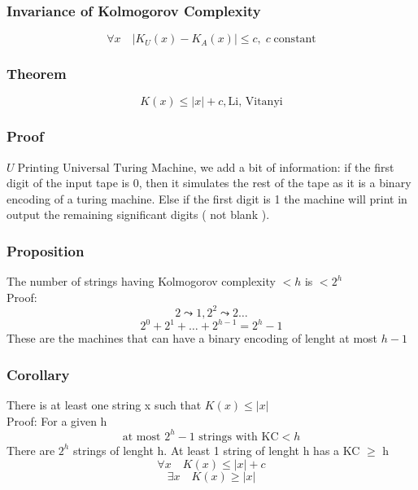     \subsubsection*{Invariance of Kolmogorov Complexity}
    $$\forall x \quad |K_U(x)- K_A(x)| \leq c,\; c \;\text{constant}$$
    \subsubsection*{Theorem}
    $$ K(x) \leq |x| +c, \text{Li, Vitanyi}$$
    \subsubsection*{Proof}
    $U\; \text{Printing Universal Turing Machine}$, we add a bit of information:
    if the first digit of the input tape is 0, then it simulates the rest of the tape as it is a binary encoding of a turing machine.
    Else if the first digit is 1 the machine will print in output the remaining significant digits ( not blank ).
    \subsubsection*{Proposition}
    The number of strings having Kolmogorov complexity $< h$ is $< 2^h$\\
    Proof:\\
    $$2 \leadsto 1, 2^2 \leadsto 2 \ldots $$
    $$2^0 + 2^1+ \ldots + 2^{h-1}= 2^{h}-1$$
    These are the machines that can have a binary encoding of lenght at most $h-1$
    \subsubsection*{Corollary}
    There is at least one string x such that $K(x)\leq|x|$\\
    Proof: For a given h 
    $$\text{at most } 2^{h}-1 \text{ strings with KC} < h$$
    There are $2^h$ strings of lenght h. At least 1 string of lenght h has a KC $\geq$ h
    $$ \forall x \quad K(x) \leq |x|+c$$
    $$\exists x \quad K(x) \geq |x|$$

